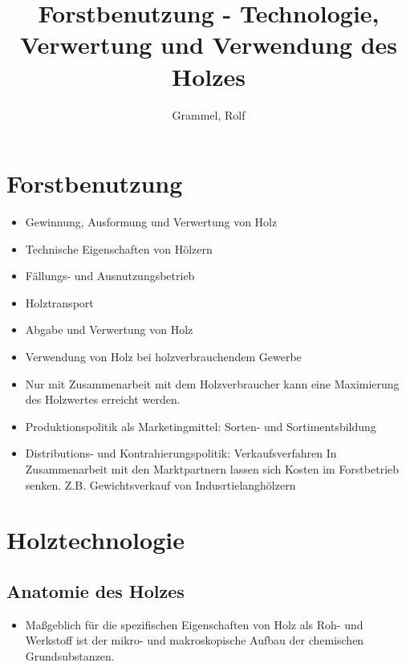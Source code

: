 \documentclass{article}
\begin{document}
\begin{titlepage}
\author{Grammel, Rolf } 
\title{Forstbenutzung - Technologie, Verwertung und Verwendung des Holzes} 
\maketitle
\newpage
\tableofcontents
\end{titlepage} 

\newpage
\section*{Forstbenutzung}
\begin{itemize}
\item Gewinnung, Ausformung und Verwertung von Holz
\item Technische Eigenschaften von Hölzern
\item Fällungs- und Ausnutzungsbetrieb
\item Holztransport
\item Abgabe und Verwertung von Holz 
\item Verwendung von Holz bei holzverbrauchendem Gewerbe
\item Nur mit Zusammenarbeit mit dem Holzverbraucher kann eine Maximierung des Holzwertes erreicht werden.
\item Produktionspolitik als Marketingmittel: Sorten- und Sortimentsbildung
\item Distributions- und Kontrahierungspolitik: Verkaufsverfahren
In Zusammenarbeit mit den Marktpartnern lassen sich Kosten im Forstbetrieb senken.
Z.B. Gewichtsverkauf von Indusrtielanghölzern
\end{itemize}




\section{Holztechnologie}


\subsection{Anatomie des Holzes}
\begin{itemize}
  \item Maßgeblich für die spezifischen Eigenschaften von Holz als Roh- und
        Werkstoff ist der mikro- und makroskopische Aufbau der chemischen
        Grundsubstanzen.
\end{itemize}
\end{document}
